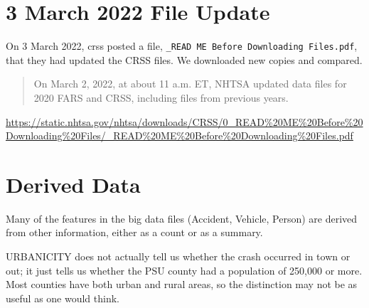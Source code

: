 \section{3 March 2022 File Update}

On 3 March 2022, \acrfull{crss} posted a file, \verb|_READ ME Before Downloading Files.pdf|, that they had updated the CRSS files.  We downloaded new copies and compared.  

\begin{quote}
On March 2, 2022, at about 11 a.m. ET, NHTSA updated data files for 2020 FARS and CRSS, including files from previous years.
\end{quote}

\url{
https://static.nhtsa.gov/nhtsa/downloads/CRSS/0_READ%

\section{Derived Data}

Many of the features in the big data files (Accident, Vehicle, Person) are derived from other information, either as a count or as a summary.  

URBANICITY does not actually tell us whether the crash occurred in town or out; it just tells us whether the PSU county had a population of 250,000 or more.  Most counties have both urban and rural areas, so the distinction may not be as useful as one would think.  